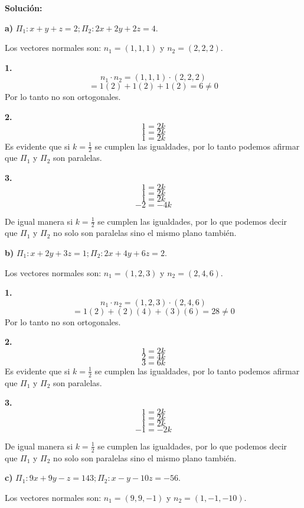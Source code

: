 \documentclass{article}
\begin{document}
\textbf{Solución:}
\vspace{10pt}


\textbf{a)} $\Pi_1 :x+y+z=2;\Pi_2 :2x+2y+2z=4$.
\vspace{10pt}


Los vectores normales son: $n_1 =(1,1,1)$ y $n_2=(2,2,2)$.
\vspace{10pt}


\textbf{1.}
$$n_1 \cdot n_2 = (1,1,1)\cdot (2,2,2)$$
$$ =1(2)+1(2)+1(2)=6 \neq 0$$
Por lo tanto no son ortogonales.
\vspace*{10pt}


\textbf{2.}
$$1 = 2k$$
$$1 = 2k$$
$$1 = 2k$$
Es evidente que si $k = \frac{1}{2} $ se cumplen las igualdades, por lo tanto podemos afirmar que $\Pi_1$ y $\Pi_2$ son paralelas.
\vspace{10pt}


\textbf{3.}
$$1 = 2k$$
$$1 = 2k$$
$$1 = 2k$$
$$-2 = -4k$$


De igual manera si $k = \frac{1}{2}$ se cumplen las igualdades, por lo que podemos decir que $\Pi_1$ y $\Pi_2$ no solo son paralelas
sino el mismo plano también.
\vspace*{10pt}


\textbf{b)} $\Pi_1 :x+2y+3z=1;\Pi_2 :2x+4y+6z=2$.
\vspace{10pt}


Los vectores normales son: $n_1 =(1,2,3)$ y $n_2=(2,4,6)$.
\vspace{10pt}


\textbf{1.}
$$n_1 \cdot n_2 = (1,2,3)\cdot (2,4,6)$$
$$ =1(2)+(2)(4)+(3)(6)=28 \neq 0$$
Por lo tanto no son ortogonales.
\vspace*{10pt}


\textbf{2.}
$$1 = 2k$$
$$2 = 4k$$
$$3 = 6k$$
Es evidente que si $k = \frac{1}{2} $ se cumplen las igualdades, por lo tanto podemos afirmar que $\Pi_1$ y $\Pi_2$ son paralelas.
\vspace{10pt}


\textbf{3.}
$$1 = 2k$$
$$1 = 2k$$
$$1 = 2k$$
$$-1 = -2k$$


De igual manera si $k = \frac{1}{2}$ se cumplen las igualdades, por lo que podemos decir que $\Pi_1$ y $\Pi_2$ no solo son paralelas
sino el mismo plano también.
\vspace*{10pt}


\textbf{c)} $\Pi_1 :9x+9y-z=143;\Pi_2 :x-y-10z=-56$.
\vspace{10pt}


Los vectores normales son: $n_1 =(9,9,-1)$ y $n_2=(1,-1,-10)$.
\vspace{10pt}
\end{document}
